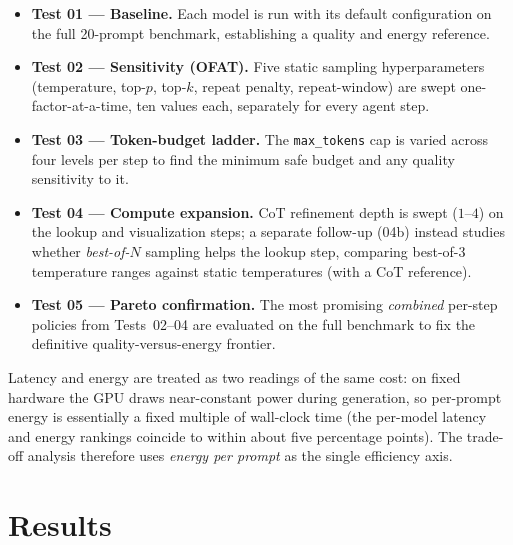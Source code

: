 \documentclass[11pt,a4paper,twocolumn]{article}
\begin{document}
\begin{itemize}[noitemsep,topsep=2pt]
    \item \textbf{Test 01 --- Baseline.} Each model is run with its default configuration on
          the full 20-prompt benchmark, establishing a quality and energy reference.
    \item \textbf{Test 02 --- Sensitivity (OFAT).} Five static sampling hyperparameters
          (temperature, top-$p$, top-$k$, repeat penalty, repeat-window) are swept
          one-factor-at-a-time, ten values each, separately for every agent step.
    \item \textbf{Test 03 --- Token-budget ladder.} The \texttt{max\_tokens} cap is varied
          across four levels per step to find the minimum safe budget and any quality
          sensitivity to it.
    \item \textbf{Test 04 --- Compute expansion.} CoT refinement depth is swept
          ($1$--$4$) on the lookup and visualization steps; a separate follow-up (04b) instead
          studies whether \emph{best-of-$N$} sampling helps the lookup step, comparing
          best-of-$3$ temperature ranges against static temperatures (with a CoT reference).
    \item \textbf{Test 05 --- Pareto confirmation.} The most promising \emph{combined}
          per-step policies from Tests~02--04 are evaluated on the full benchmark to fix the
          definitive quality-versus-energy frontier.
\end{itemize}

Latency and energy are treated as two readings of the same cost: on fixed hardware the GPU
draws near-constant power during generation, so per-prompt energy is essentially a fixed
multiple of wall-clock time (the per-model latency and energy rankings coincide to within
about five percentage points). The trade-off analysis therefore uses \emph{energy per prompt}
as the single efficiency axis.

\section{Results}
\label{sec:es_results}
\end{document}
